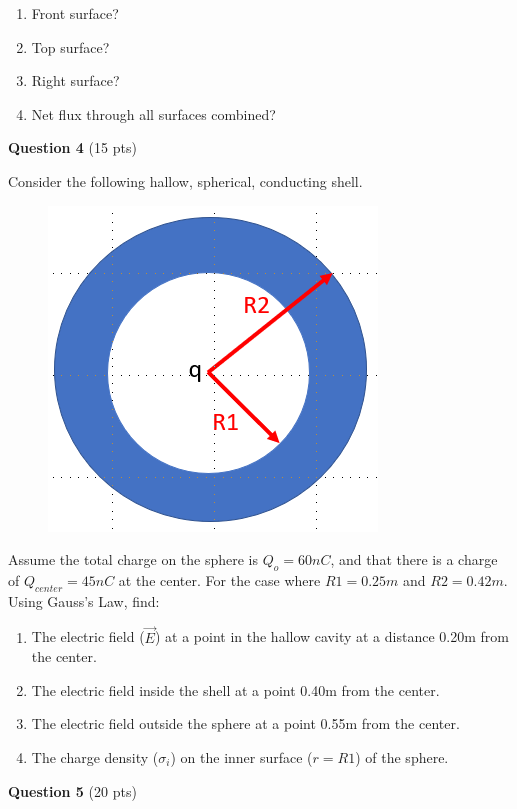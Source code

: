 \documentclass[14pt]{report}
\begin{document}
\begin{enumerate}[label=\Alph*]
\item Front surface?
\item Top surface?
\item Right surface?
\item Net flux through all surfaces combined?
\end{enumerate}

\textbf{Question 4} (15 pts)

Consider the following hallow, spherical, conducting shell. 

\begin{figure}[H]
\begin{center}
\includegraphics[scale=0.40]{exam1_5.png}
\end{center}
\end{figure}
Assume the total charge on the sphere is $Q_o = 60nC$, and that there is a charge of $Q_{center} = 45nC$ at the center. For the case where $R1 = 0.25m$ and $R2 = 0.42m$. Using Gauss's Law, find:

\begin{enumerate}[label=\Alph*]
\item The electric field ($\vec{E}$) at a point in the hallow cavity at a distance 0.20m from the center.
\item The electric field inside the shell at a point 0.40m from the center. 
\item The electric field outside the sphere at a point 0.55m from the center. 
\item The charge density ($\sigma_i$) on the inner surface ($r = R1$) of the sphere.
\end{enumerate}

\newpage
\textbf{Question 5} (20 pts)
\end{document}
